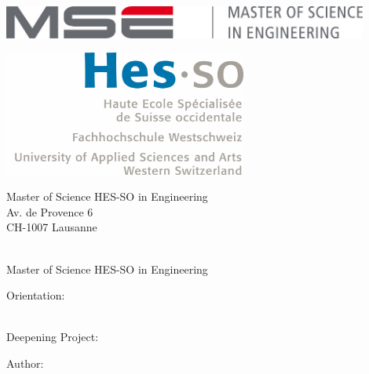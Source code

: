 \begin{titlepage}
{\selectfont
	\begin{flushright}
		\begin{minipage}{0.5\textwidth}
			\begin{flushleft}
				\includegraphics[width=0.9\textwidth]{99-imgs/logo_mse}
			\end{flushleft}
		\end{minipage}%
		\begin{minipage}{0.5\textwidth}
			\begin{flushright}
				\includegraphics[width=0.6\textwidth]{99-imgs/logo_hesso}
			\end{flushright}
		\end{minipage}
		\begin{flushleft}\scriptsize
		Master of Science HES-SO in Engineering \\
		Av. de Provence 6 \\
		CH-1007 Lausanne
		\end{flushleft}
		
		~\\[0.5cm]
		
		{\Huge Master of Science HES-SO in Engineering\\[0.5cm]}
		
		{\LARGE Orientation: \Orientation\\[0.5cm] ~\\[1cm]}
		
		{\LARGE Deepening Project: \Huge \ThesisTitle \\[1.5cm]}
		
		{
		\large Author:\\
		\Huge \Author \\ %
		\large \texttt{\AuthorEmail} \\[1cm]
		}
		

\end{flushright}}
\end{titlepage}
